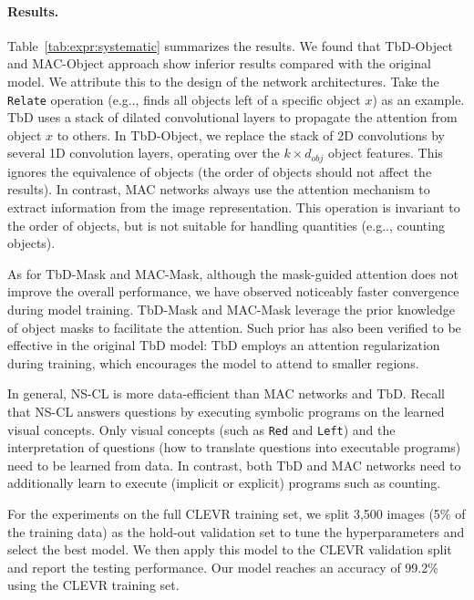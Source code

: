 \documentclass{article} %
\makeatletter
\DeclareRobustCommand\onedot{\futurelet\@let@token\@onedot}
\def\@onedot{\ifx\@let@token.\else.\null\fi\xspace}
\def\eg{e.g\onedot} \def\Eg{E.g\onedot}
\newcommand{\model}{NS-CL\xspace}
\makeatother
\begin{document}
{\paragraph{Results. } Table~\ref{tab:expr:systematic} summarizes the results. We found that TbD-Object and MAC-Object approach show inferior results compared with the original model. We attribute this to the design of the network architectures. Take the {\tt Relate} operation (\eg, finds all objects left of a specific object $x$) as an example. TbD uses a stack of dilated convolutional layers to propagate the attention from object $x$ to others. In TbD-Object, we replace the stack of 2D convolutions by several 1D convolution layers, operating over the $k \times d_{obj}$ object features. This ignores the equivalence of objects (the order of objects should not affect the results). In contrast, MAC networks always use the attention mechanism to extract information from the image representation. This operation is invariant to the order of objects, but is not suitable for handling quantities (\eg, counting objects).

As for TbD-Mask and MAC-Mask, although the mask-guided attention does not improve the overall performance, we have observed noticeably faster convergence during model training. TbD-Mask and MAC-Mask leverage the prior knowledge of object masks to facilitate the attention. Such prior has also been verified to be effective in the original TbD model: TbD employs an attention regularization during training, which encourages the model to attend to smaller regions.

In general, \model is more data-efficient than MAC networks and TbD. Recall that \model answers questions by executing symbolic programs on the learned visual concepts. Only visual concepts (such as \texttt{Red} and \texttt{Left}) and the interpretation of questions (how to translate questions into executable programs) need to be learned from data. In contrast, both TbD and MAC networks need to additionally learn to execute (implicit or explicit) programs such as counting.

For the experiments on the full CLEVR training set, we split 3,500 images (5\% of the training data) as the hold-out validation set to tune the hyperparameters and select the best model. We then apply this model to the CLEVR validation split and report the testing performance. Our model reaches an accuracy of 99.2\% using the CLEVR training set.

%

%

}
\end{document}
